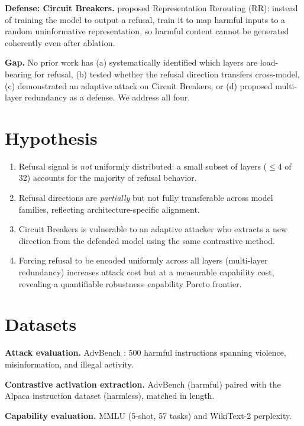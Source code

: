 \documentclass[11pt]{article}
\begin{document}
\textbf{Defense: Circuit Breakers.} \citet{zou2024circuitbreakers} proposed
Representation Rerouting (RR): instead of training the model to output a
refusal, train it to map harmful inputs to a random uninformative
representation, so harmful content cannot be generated coherently even
after ablation.

\textbf{Gap.} No prior work has (a) systematically identified which layers
are load-bearing for refusal, (b) tested whether the refusal direction
transfers cross-model, (c) demonstrated an adaptive attack on Circuit
Breakers, or (d) proposed multi-layer redundancy as a defense. We
address all four.

\section{Hypothesis}\label{hypothesis}

\begin{enumerate}
\item
  Refusal signal is \emph{not} uniformly distributed: a small subset of
  layers (\(\leq\)4 of 32) accounts for the majority of
  refusal behavior.
\item
  Refusal directions are \emph{partially} but not fully transferable across
  model families, reflecting architecture-specific alignment.
\item
  Circuit Breakers is vulnerable to an adaptive attacker who extracts
  a new direction from the defended model using the same contrastive
  method.
\item
  Forcing refusal to be encoded uniformly across all layers
  (multi-layer redundancy) increases attack cost but at a measurable
  capability cost, revealing a quantifiable robustness--capability
  Pareto frontier.
\end{enumerate}

\section{Datasets}\label{datasets}

\textbf{Attack evaluation.} AdvBench \citep{zou2023universal}: 500 harmful
instructions spanning violence, misinformation, and illegal activity.

\textbf{Contrastive activation extraction.} AdvBench (harmful) paired with
the Alpaca instruction dataset \citep{alpaca} (harmless), matched in length.

\textbf{Capability evaluation.} MMLU \citep{hendrycks2021mmlu} (5-shot, 57 tasks)
and WikiText-2 perplexity.
\end{document}
